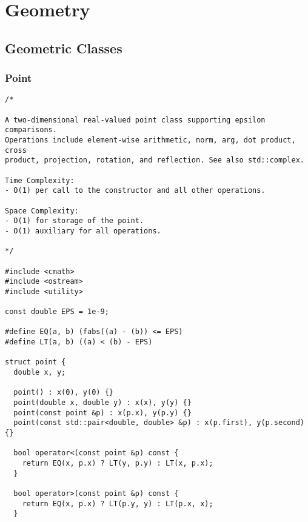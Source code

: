 \chapter{Geometry}

\section{Geometric Classes}
\setcounter{section}{1}
\setcounter{subsection}{0}
\subsection{Point}
\begin{lstlisting}
/*

A two-dimensional real-valued point class supporting epsilon comparisons.
Operations include element-wise arithmetic, norm, arg, dot product, cross
product, projection, rotation, and reflection. See also std::complex.

Time Complexity:
- O(1) per call to the constructor and all other operations.

Space Complexity:
- O(1) for storage of the point.
- O(1) auxiliary for all operations.

*/

#include <cmath>
#include <ostream>
#include <utility>

const double EPS = 1e-9;

#define EQ(a, b) (fabs((a) - (b)) <= EPS)
#define LT(a, b) ((a) < (b) - EPS)

struct point {
  double x, y;

  point() : x(0), y(0) {}
  point(double x, double y) : x(x), y(y) {}
  point(const point &p) : x(p.x), y(p.y) {}
  point(const std::pair<double, double> &p) : x(p.first), y(p.second) {}

  bool operator<(const point &p) const {
    return EQ(x, p.x) ? LT(y, p.y) : LT(x, p.x);
  }

  bool operator>(const point &p) const {
    return EQ(x, p.x) ? LT(p.y, y) : LT(p.x, x);
  }


\end{lstlisting}

